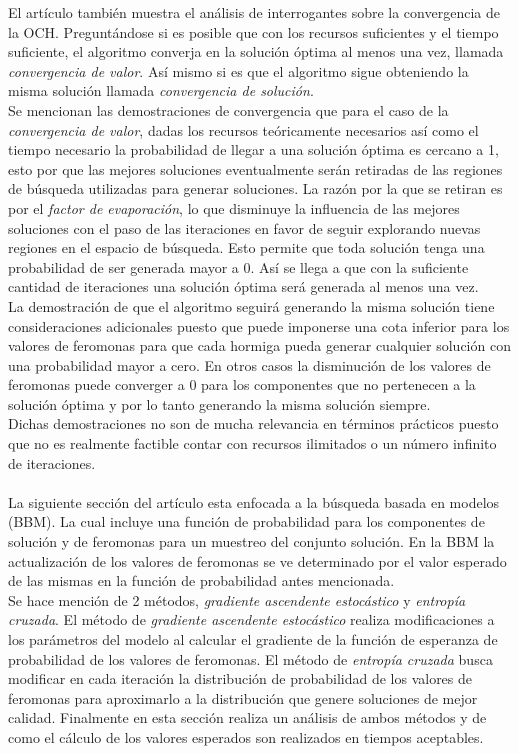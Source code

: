 \documentclass[12pt]{article}
\begin{document}
	El artículo también muestra el análisis de interrogantes sobre la convergencia de la OCH. Preguntándose si es posible que con los recursos suficientes y el tiempo suficiente, el algoritmo converja en la solución óptima al menos una vez, llamada \textit{convergencia de valor}. Así mismo si es que el algoritmo sigue obteniendo la misma solución llamada \textit{convergencia de solución}.\pagebreak\\
	Se mencionan las demostraciones de convergencia que para el caso de la \textit{convergencia de valor}, dadas los recursos teóricamente necesarios así como el tiempo necesario la probabilidad de llegar a una solución óptima es cercano a 1, esto por que las mejores soluciones eventualmente serán retiradas de las regiones de búsqueda utilizadas para generar soluciones. La razón por la que se retiran es por el \textit{factor de evaporación}, lo que disminuye la influencia de las mejores soluciones con el paso de las iteraciones en favor de seguir explorando nuevas regiones en el espacio de búsqueda. Esto permite que toda solución tenga una probabilidad de ser generada mayor a 0. Así se llega a que con la suficiente cantidad de iteraciones una solución óptima será generada al menos una vez. \\ 
	La demostración de que el algoritmo seguirá generando la misma solución tiene consideraciones adicionales puesto que puede imponerse una cota inferior para los valores de feromonas para que cada hormiga pueda generar cualquier solución con una probabilidad mayor a cero. En otros casos la disminución de los valores de feromonas puede converger a 0 para los componentes que no pertenecen a la solución óptima y por lo tanto generando la misma solución siempre.\\
	Dichas demostraciones no son de mucha relevancia en términos prácticos puesto que no es realmente factible contar con recursos ilimitados o un número infinito de iteraciones.\\\\
	La siguiente sección del artículo esta enfocada a la búsqueda basada en modelos (BBM). La cual incluye una función de probabilidad para los componentes de solución y de feromonas para un muestreo del conjunto solución. En la BBM la actualización de los valores de feromonas se ve determinado por el valor esperado de las mismas en la función de probabilidad antes mencionada.\\ Se hace mención de 2 métodos, \textit{gradiente ascendente estocástico} y \textit{entropía cruzada}. El método de \textit{gradiente ascendente estocástico} realiza modificaciones a los parámetros del modelo al calcular el gradiente de la función de esperanza de probabilidad de los valores de feromonas. El método de \textit{entropía cruzada} busca modificar en cada iteración la distribución de probabilidad de los valores de feromonas para aproximarlo a la distribución que genere soluciones de mejor calidad. Finalmente en esta sección realiza un análisis de ambos métodos y de como el cálculo de los valores esperados son realizados en tiempos aceptables.\\\pagebreak\\
\end{document}
